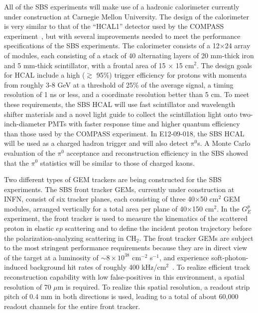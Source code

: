 All of the SBS experiments will make use of a hadronic calorimeter currently under construction at Carnegie Mellon University. The design of the calorimeter is very similar to that of the ``HCAL1'' detector used by the COMPASS experiment~\cite{HCAL1}, but with several improvements needed to meet the performance specifications of the SBS experiments. The calorimeter consists of a 12$\times$24 array of modules, each consisting of a stack of 40 alternating layers of 20 mm-thick iron and 5 mm-thick scintillator, with a frontal area of 15 $\times$ 15 cm$^2$. The design goals for HCAL include a high ($\gtrsim$ 95\%) trigger efficiency for protons with momenta from roughly 3-8 GeV at a threshold of 25\% of the average signal, a timing resolution of 1 ns or less, and a coordinate resolution better than 5 cm. To meet these requirements, the SBS HCAL will use fast scintillator and wavelength shifter materials and a novel light guide to collect the scintillation light onto two-inch-diameter PMTs with faster response time and higher quantum efficiency than those used by the COMPASS experiment. %
In E12-09-018, the SBS HCAL will be used as a charged hadron trigger and will also detect $\pi^0$s. A Monte Carlo evaluation of the $\pi^0$ acceptance and reconstruction efficiency in the SBS showed that the $\pi^0$ statistics will be similar to those of charged kaons.

Two different types of GEM trackers are being constructed for the SBS experiments. The SBS front tracker GEMs, currently under construction at INFN, consist of six tracker planes, each consisting of three 40$\times$50 cm$^2$ GEM modules, arranged vertically for a total area per plane of 40$\times$150 cm$^2$. In the $G_E^p$ experiment, the front tracker is used to measure the kinematics of the scattered proton in elastic $ep$ scattering and to define the incident proton trajectory before the polarization-analyzing scattering in CH$_2$. The front tracker GEMs are subject to the most stringent performance requirements because they are in direct view of the target at a luminosity of $\sim 8\times 10^{38}$ cm$^{-2}$ s$^{-1}$, and experience soft-photon-induced background hit rates of roughly 400 kHz/cm$^2$~\cite{SBS_CDR_NEW}. To realize efficient track reconstruction capability with low false-positives in this environment, a spatial resolution of 70 $\mu$m is required. To realize this spatial resolution, a readout strip pitch of 0.4 mm in both directions is used, leading to a total of about 60,000 readout channels for the entire front tracker. 

